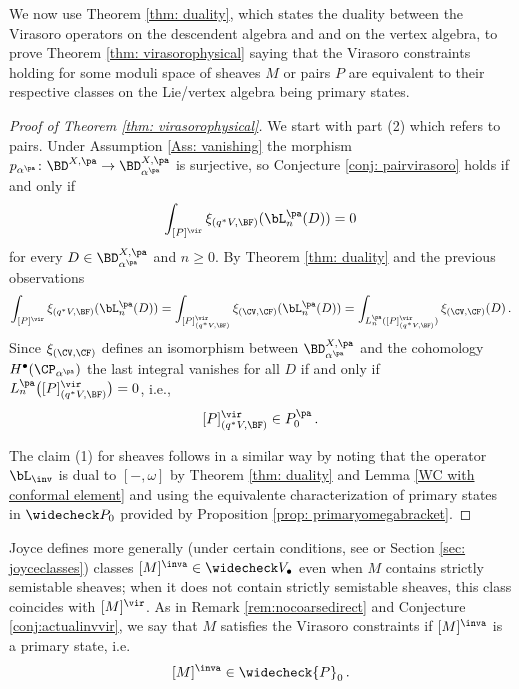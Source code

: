 We now use Theorem \ref{thm: duality}, which states the duality between the Virasoro operators on the descendent algebra and and on the vertex algebra, to prove Theorem \ref{thm: virasorophysical} saying that the Virasoro constraints holding for some moduli space of sheaves $M$ or pairs $P$ are equivalent to their respective classes on the Lie/vertex algebra being primary states.
\begin{proof}[Proof of Theorem \ref{thm: virasorophysical}]
We start with part (2) which refers to pairs. Under Assumption \ref{Ass: vanishing} the morphism
$p_{\alpha^{\pa}}\colon \BD^{X, \pa}\to \BD^{X, \pa}_{\alpha^{\pa}}$ is surjective, so Conjecture \ref{conj: pairvirasoro} holds if and only if
\[\int_{[P]^\vir}\xi_{(q^\ast V, \BF)}(\bL_n^{\pa}(D))=0\]
for every $D\in \BD^{X, \pa}_{\alpha^{\pa}}$ and $n\geq 0$. By Theorem \ref{thm: duality} and the previous observations
\[\int_{[P]^\vir}\xi_{(q^\ast V, \BF)}(\bL_n^{\pa}(D))=\int_{[P]^\vir_{(q^\ast V, \BF)}}\xi_{(\CV, \CF)}(\bL_n^{\pa}(D))=\int_{L_n^{\pa}([P]^\vir_{(q^\ast V, \BF)})}\xi_{(\CV, \CF)}(D)\,.\]
Since $\xi_{(\CV, \CF)}$ defines an isomorphism between $\BD^{X, \pa}_{\alpha^{\pa}}$ and the cohomology $H^\bullet(\CP_{\alpha^{\pa}})$ the last integral vanishes for all $D$ if and only if $L_n^{\pa}\big([P]^\vir_{(q^\ast V, \BF)}\big)=0$, i.e.,
\[[P]^\vir_{(q^\ast V, \BF)}\in P_0^{\pa}\,.\]

The claim (1) for sheaves follows in a similar way by noting that the operator $\bL_\inv$ is dual to $[-, \omega]$ by Theorem \ref{thm: duality} and Lemma \ref{WC with conformal element} and using the equivalente characterization of primary states in $\widecheck P_0$ provided by Proposition \ref{prop: primaryomegabracket}.\qedhere
\end{proof}

Joyce defines more generally (under certain conditions, see \cite[Theorem 5.7]{Jo21} or Section \ref{sec: joyceclasses}) classes $[M]^\inva\in \widecheck V_\bullet$ even when $M$ contains strictly semistable sheaves; when it does not contain strictly semistable sheaves, this class coincides with $[M]^\vir$. As in Remark \ref{rem:nocoarsedirect} and Conjecture \ref{conj:actualinvvir}, we say that $M$ satisfies the Virasoro constraints if $[M]^\inva$ is a primary state, i.e.
$$
  [M]^{\inva}\in \widecheck{P}_0\,.
$$
